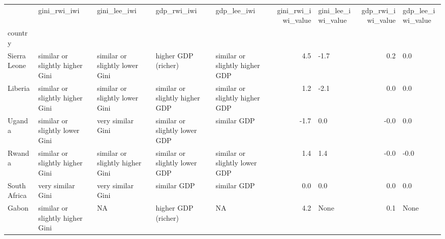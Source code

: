 \begin{tabular}{lllllrlrl}
\toprule
{} &                     gini\_rwi\_iwi &                     gini\_lee\_iwi &                     gdp\_rwi\_iwi &                     gdp\_lee\_iwi &  gini\_rwi\_iwi\_value & gini\_lee\_iwi\_value &  gdp\_rwi\_iwi\_value & gdp\_lee\_iwi\_value \\
country      &                                  &                                  &                                 &                                 &                     &                    &                    &                   \\
\midrule
Sierra Leone &  similar or slightly higher Gini &   similar or slightly lower Gini &             higher GDP (richer) &  similar or slightly higher GDP &                 4.5 &               -1.7 &                0.2 &               0.0 \\
Liberia      &  similar or slightly higher Gini &   similar or slightly lower Gini &  similar or slightly higher GDP &  similar or slightly higher GDP &                 1.2 &               -2.1 &                0.0 &               0.0 \\
Uganda       &   similar or slightly lower Gini &                very similar Gini &   similar or slightly lower GDP &                     similar GDP &                -1.7 &                0.0 &               -0.0 &               0.0 \\
Rwanda       &  similar or slightly higher Gini &  similar or slightly higher Gini &   similar or slightly lower GDP &   similar or slightly lower GDP &                 1.4 &                1.4 &               -0.0 &              -0.0 \\
South Africa &                very similar Gini &                very similar Gini &                     similar GDP &                     similar GDP &                 0.0 &                0.0 &                0.0 &               0.0 \\
Gabon        &  similar or slightly higher Gini &                               NA &             higher GDP (richer) &                              NA &                 4.2 &               None &                0.1 &              None \\
\bottomrule
\end{tabular}
